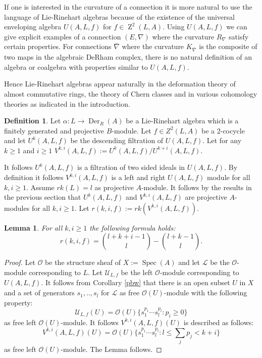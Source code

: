 \documentclass{amsart}
\theoremstyle{plain}
\newtheorem{lemma}[theorem]{Lemma}
\theoremstyle{definition}
\newtheorem{definition}[theorem]{Definition}
\theoremstyle{remark}
\numberwithin{equation}{theorem}
\begin{document}
If one is interested in the curvature of a connection it is more natural to use the language of Lie-Rinehart algebras 
because of the existence of the universal enveloping algebra $U({A},L,f)$ for $f\in {\operatorname{Z}}^2(L,{A})$. 
Using $U({A},L,f)$  we can give explicit
examples of a connection $(E,\nabla)$ where the curvature $R_{\nabla}$ satisfy certain properties.
For connections $\overline{\nabla}$ where the curvature $K_{\overline{\nabla}}$ is the composite
of two maps in the algebraic DeRham complex, there is no natural definition of an algebra or coalgebra
with properties similar to $U({A},L,f)$. 

Hence Lie-Rinehart algebras appear naturally in the deformation 
theory of almost commutative rings, the theory of Chern classes and in various cohomology theories
as indicated in the introduction.

\begin{definition}
Let $\alpha:L\rightarrow {\operatorname{Der} }_{R}({A})$  be a Lie-Rinehart algebra which is a finitely generated
and projective $B$-module. Let $f\in Z^2(L,{A})$ be a 2-cocycle
and let $U^k({A},L,f)$ be the descending filtration of $U({A},L,f)$. 
Let for any $k\geq 1$ and $i\geq 1$ $V^{k,i}({A},L,f):=U^k({A},L,f)/U^{k+i}({A},L,f)$.
\end{definition}

It follows $U^k({A},L,f)$ is a filtration of two sided ideals in $U({A},L,f)$.
By definition it follows $V^{k,i}({A},L,f)$ is a left and right $U({A},L,f)$ module for all $k,i\geq 1$.
Assume $rk(L)=l$ as projective ${A}$-module. It follows by the results in the previous section that
$U^k({A},L,f)$ and $V^{k,i}({A},L,f)$ are projective ${A}$-modules for all $k,i\geq 1$. Let $r(k,i,f):=rk(V^{k,i}({A},L,f))$.

\begin{lemma} For all $k,i\geq 1$ the following formula holds:
\[ r(k,i,f) =\binom{l+k+i-1}{l}-\binom{l+k-1}{l}.\]
\end{lemma}
\begin{proof} Let ${\mathcal{O} }$ be the structure sheaf of $X:={\operatorname{Spec} }({A})$ and let $\mathcal{L}$ be the ${\mathcal{O} }$-module corresponding to
$L$. Let $\mathcal{U}_{L,f}$ be the left ${\mathcal{O} }$-module corresponding to $U({A},L,f)$. It follows from Corollary \ref{pbw}
that there is an open subset $U$ in $X$ and a set of generators $s_1,..,s_l$ for $\mathcal{L}$ as free ${\mathcal{O} }(U)$-module
with the following property:
\[ \mathcal{U}_{L,f}(U)={\mathcal{O} }(U)\{s_1^{p_1}\cdots s_l^{p_l}: p_i\geq 0\} \]
as free left ${\mathcal{O} }(U)$-module.
It follows $V^{k,i}({A},L,f)(U)$ is described as follows:
\[ V^{k,i}({A},L,f)(U)={\mathcal{O} }(U)\{s_1^{p_1}\cdots s_l^{p_l}:l\leq \sum_j p_j < k+i\}\]
as free left ${\mathcal{O} }(U)$-module.
The Lemma follows.
\end{proof}
\end{document}
